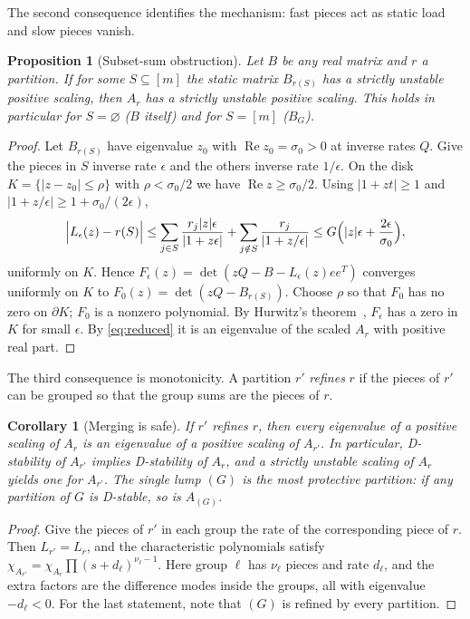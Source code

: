 \documentclass[11pt,a4paper]{article}
\theoremstyle{plain}
\newtheorem{proposition}[theorem]{Proposition}
\newtheorem{corollary}[theorem]{Corollary}
\theoremstyle{definition}
\theoremstyle{remark}
\newcommand{\Real}{\operatorname{Re}}
\begin{document}
The second consequence identifies the mechanism: fast pieces act as static
load and slow pieces vanish.

\begin{proposition}[Subset-sum obstruction]\label{prop:subsetsum}
Let $B$ be any real matrix and $r$ a partition. If for some
$S\subseteq[m]$ the static matrix $B_{r(S)}$ has a strictly unstable positive
scaling, then $A_r$ has a strictly unstable positive scaling. This holds in
particular for $S=\varnothing$ ($B$ itself) and for $S=[m]$ ($B_G$).
\end{proposition}
\begin{proof}
Let $B_{r(S)}$ have eigenvalue $z_0$ with $\Real z_0=\sigma_0>0$ at inverse
rates $Q$. Give the pieces in $S$ inverse rate $\epsilon$ and the others
inverse rate $1/\epsilon$. On the disk $K=\{|z-z_0|\le\rho\}$ with
$\rho<\sigma_0/2$ we have $\Real z\ge\sigma_0/2$. Using $|1+zt|\ge1$ and
$|1+z/\epsilon|\ge1+\sigma_0/(2\epsilon)$,
\[
 \Bigl|L_\epsilon(z)-r(S)\Bigr|\le\sum_{j\in S}\frac{r_j|z|\epsilon}{|1+z\epsilon|}
 +\sum_{j\notin S}\frac{r_j}{|1+z/\epsilon|}\le
 G\Bigl(|z|\epsilon+\frac{2\epsilon}{\sigma_0}\Bigr),
\]
uniformly on $K$. Hence $F_\epsilon(z)=\det(zQ-B-L_\epsilon(z)ee^{T})$
converges uniformly on $K$ to $F_0(z)=\det(zQ-B_{r(S)})$. Choose $\rho$ so that
$F_0$ has no zero on $\partial K$; $F_0$ is a nonzero polynomial. By
Hurwitz's theorem~\cite{conway1978}, $F_\epsilon$ has a zero in $K$ for small
$\epsilon$. By \eqref{eq:reduced} it is an eigenvalue of the scaled $A_r$ with
positive real part.
\end{proof}

The third consequence is monotonicity. A partition $r'$ \emph{refines} $r$ if
the pieces of $r'$ can be grouped so that the group sums are the pieces of $r$.

\begin{corollary}[Merging is safe]\label{cor:merge}
If $r'$ refines $r$, then every eigenvalue of a positive scaling of $A_r$ is an
eigenvalue of a positive scaling of $A_{r'}$. In particular, D-stability of
$A_{r'}$ implies D-stability of $A_r$, and a strictly unstable scaling of $A_r$
yields one for $A_{r'}$. The single lump $(G)$ is the most protective
partition: if any partition of $G$ is D-stable, so is $A_{(G)}$.
\end{corollary}
\begin{proof}
Give the pieces of $r'$ in each group the rate of the corresponding piece of
$r$. Then $L_{r'}=L_r$, and the characteristic polynomials satisfy
$\chi_{A_{r'}}=\chi_{A_r}\prod(s+d_\ell)^{\nu_\ell-1}$. Here group $\ell$ has
$\nu_\ell$ pieces and rate $d_\ell$, and the extra factors are the difference
modes inside the groups, all with eigenvalue $-d_\ell<0$. For the last
statement, note that $(G)$ is refined by every partition.
\end{proof}
\end{document}
